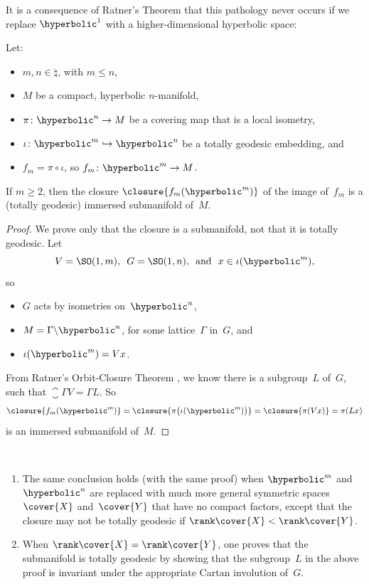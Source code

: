 It is a consequence of Ratner's Theorem that this pathology never occurs if we replace $\hyperbolic^1$ with a higher-dimensional hyperbolic space:

\begin{cor} \label{GoodClosure(hyper)}
 Let:
 \begin{itemize}
 \item $m,n \in \natural$, with $m \le n$,
 \item $M$ be a  compact, hyperbolic $n$-manifold,
\item $\pi \colon \hyperbolic^n \to M$ be a covering map that is a local isometry,
\item $\iota \colon \hyperbolic^m \hookrightarrow
\hyperbolic^n$ be a totally geodesic embedding,
and
\item $f_m = \pi \circ \iota$, so $f_m \colon \hyperbolic^m  \to M$.
 \end{itemize}
If $m \ge 2$, then the closure $\closure{f_m(\hyperbolic^m)}$ of the image of~$f_m$ is a \textup(totally geodesic\textup) immersed submanifold of~$M$.
\end{cor}

\begin{proof}
We prove only that the closure is a submanifold, not that it is totally geodesic.
Let 
	$$ \text{$V = \SO(1,m)$, \  $G =  \SO(1,n)$, 
	\ and \  $x \in \iota(\hyperbolic^m)$} ,$$
so 
	\begin{itemize}
	\item$G$ acts by isometries on~$\hyperbolic^n$,
	\item $M = \Gamma \backslash \hyperbolic^n$, for some lattice~$\Gamma$ in~$G$,
	and
	\item $\iota(\hyperbolic^m) = V x$.
	\end{itemize}
From Ratner's Orbit-Closure Theorem , we know there is a subgroup~$L$ of~$G$, such that 
	$ \closure{\Gamma V} = \Gamma L $.
So 
	$$ \closure{f_m(\hyperbolic^m)}  = \closure{ \pi \bigl( \iota( \hyperbolic^m ) \bigr)}= \closure{\pi(V x)} = \pi(Lx) $$
is an immersed submanifold of~$M$.
\end{proof}

\begin{rems} \label{GoodClosure(LocSymm)} \ 
\begin{enumerate}
\item \label{GoodClosure(LocSymm)-closure}
The same conclusion holds (with the same proof) when $\hyperbolic^m$ and $\hyperbolic^n$ are replaced with much more general symmetric spaces $\cover{X}$ and~$\cover{Y}$ that have no compact factors, except that the closure may not be totally geodesic if $\rank\cover{X} < \rank\cover{Y}$.
\item When $\rank\cover{X} = \rank\cover{Y}$, one proves that the submanifold is totally geodesic by showing that the subgroup~$L$ in the above proof is invariant under the appropriate Cartan involution of~$G$.
\end{enumerate}
\end{rems}


